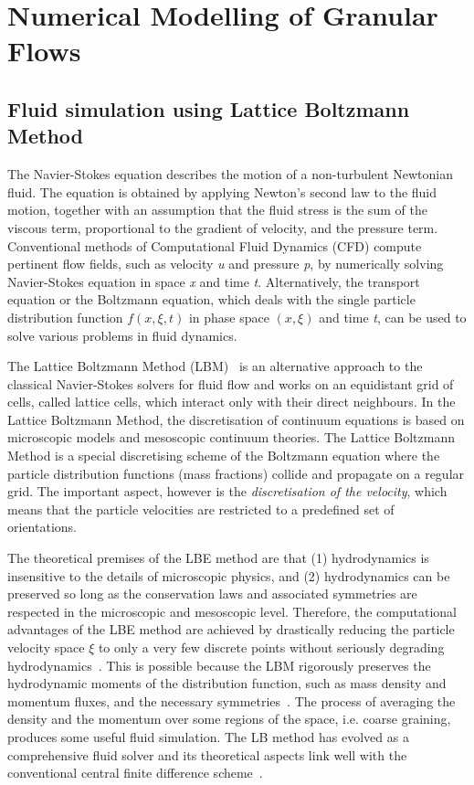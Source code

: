 \chapter{Numerical Modelling of Granular Flows}

\ifpdf
    \graphicspath{{Chapter3/figs/raster/}{Chapter3/figs/pdf/}{Chapter3/figs/}}
\else
    \graphicspath{{Chapter3/figs/vector/}{Chapter3/figs/}}
\fi


\section{Fluid simulation using Lattice Boltzmann Method}
The Navier-Stokes equation describes the motion of a non-turbulent Newtonian fluid. The equation is obtained by applying Newton's second law to the fluid motion, together with an assumption that the fluid stress is the sum of the viscous term, proportional to the gradient of velocity, and the pressure term. Conventional methods of Computational Fluid Dynamics (CFD) compute pertinent flow fields, such as velocity \textit{u} and pressure \textit{p}, by numerically solving Navier-Stokes equation in space \textit{x} and time \textit{t}. Alternatively, the transport equation or the Boltzmann equation, which deals with the single particle distribution function $f(x,\xi,t)$ in phase space $(x,\xi)$ and time \textit{t}, can be used to solve various problems in fluid dynamics. 

The Lattice Boltzmann Method (LBM)~\citep{He1997a,He1997b,Chen1998,Mei2000,Han2007,Zhou2012} is an alternative approach to the classical Navier-Stokes solvers for fluid flow and works on an equidistant grid of cells, called lattice cells, which interact only with their direct neighbours. In the Lattice Boltzmann Method, the discretisation of continuum equations is based on microscopic models and mesoscopic continuum theories. The Lattice Boltzmann Method is a special discretising scheme of the Boltzmann equation where the particle distribution functions (mass fractions) collide and propagate on a regular grid. The important aspect, however is the \textit{discretisation of the velocity}, which means that the particle velocities are restricted to a predefined set of orientations.

The theoretical premises of the LBE method are that (1) hydrodynamics is insensitive to the details of microscopic physics, and (2) hydrodynamics can be preserved so long as the conservation laws and associated symmetries are respected in the microscopic and mesoscopic level. Therefore, the computational advantages of the LBE method are achieved by drastically reducing the particle velocity space $\xi$ to only a very few discrete points without seriously degrading hydrodynamics~\citep{Mei2000}. This is possible because the LBM rigorously preserves the hydrodynamic moments of the distribution function, such as mass density and momentum fluxes, and the necessary symmetries~\citep{He1997a,He1997b}. The process of averaging the density and the momentum over some regions of the space, i.e. coarse graining, produces some useful fluid simulation. The LB method has evolved as a comprehensive fluid solver and its theoretical aspects link well with the conventional central finite difference scheme~\citep{Cook2004}.

